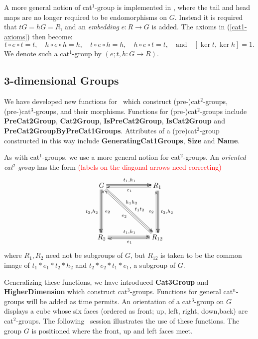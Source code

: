 \documentclass[a4paper,11pt]{article}
\theoremstyle{plain}
\theoremstyle{definition}
\begin{document}
A more general notion of cat$^1$-group is implemented in \XMod, 
where the tail and head maps are no longer required to be endomorphisms on $G$. 
Instead it is required that $tG=hG=R$, and an \emph{embedding} $e : R \to G$ 
is added.  
The axioms in (\ref{cat1-axioms}) then become:  
\[ 
t \circ e \circ t = t, \quad  
h \circ e \circ h = h, \quad  
t \circ e \circ h = h, \quad  
h \circ e \circ t = t, 
\quad \mbox{and}\quad  [\ker t,\ker h] = 1. 
\] 
We denote such a cat$^1$-group by $(e;t,h : G \to R)$. 


\subsection{3-dimensional Groups}

We have developed new functions for \XMod\ which construct 
(pre-)cat$^{2}$-groups, (pre-)cat$^{3}$-groups, and their morphisms. 
Functions for (pre-)cat$^{2} $-groups include \textbf{PreCat2Group},
\textbf{Cat2Group}, \textbf{IsPreCat2Group}, \textbf{IsCat2Group} 
and \textbf{PreCat2GroupByPreCat1Groups}. 
Attributes of a (pre)cat$^{2}$-group constructed in this way include 
\textbf{GeneratingCat1Groups}, \textbf{Size} and \textbf{Name}. 

As with cat$^1$-groups, we use a more general notion for cat$^2$-groups. 
An \emph{oriented cat$^2$-group} has the form 
\textcolor{red}
{(labels on the diagonal arrows need correcting)} 
\[
\xymatrix@R=60pt@C=60pt 
{ G \ar@<+0.5ex>[r]^{t_1,h_1} \ar@<+0.1ex>[r] 
    \ar@<-0.5ex>[d]_{t_2,h_2} \ar@<-0.1ex>[d] 
    \ar@<+0.5ex>[rd]^(.55){t_1t_2} \ar@<+0.1ex>[rd]^(.40){h_1h_2} 
	& R_1 \ar@<+0.5ex>[d]^{t_2,h_2} \ar@<+0.1ex>[d] 
	      \ar@<+0.4ex>[l]^{e_1} \\
  R_2 \ar@<+0.5ex>[r]^{t_1,h_1} \ar@<+0.1ex>[r] 
      \ar@<-0.4ex>[u]_{e_2} 
	& R_{12} \ar@<+0.4ex>[l]^{e_1} \ar@<+0.4ex>[u]^{e_2} 
	         \ar@<+0.4ex>[ul]^{e_2} 
}
\]
where $R_1, R_2$ need not be subgroups of $G$, 
but $R_{12}$ is taken to be the common image of 
$t_1*e_1*t_2*h_2$ and $t_2*e_2*t_1*e_1$, a subgroup of $G$. 


Generalizing these functions, we have introduced \textbf{Cat3Group} and \textbf{HigherDimension} which construct cat$^{3}$-groups. 
Functions for general cat$^{n}$-groups will be added as time permits. 
An orientation of a cat$^{3}$-group on $G$ displays a cube whose six faces 
(ordered as front; up, left, right, down,back) are cat$^{2}$-groups. 
The following \GAP\ session illustrates the use of these functions. 
The group $G$ is positioned where the front, up and left faces meet. 
\end{document}
